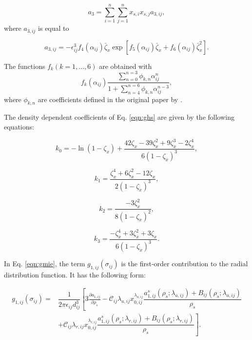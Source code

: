 \begin{equation}
a_{3} = \sum_{i=1}^{n} \sum_{j=1}^{n} x_{s,i} x_{s,j} a_{3,ij},
\end{equation}	
where $a_{3,ij}$ is equal to

\begin{equation}
a_{3,ij} = - \epsilon _{ij}^{3} f_{4}(\alpha_{ij}) \bar{\zeta}_{x} \exp[f_{5}(\alpha_{ij}) \bar{\zeta}_{x}+ f_{6}(\alpha_{ij}) \bar{\zeta}_{x}^{2}].
\end{equation}

The functions $f_{k}(k=1,...,6)$ are obtained with
\begin{equation}
f_{k}(\alpha_{ij}) \dfrac{\sum_{n=0}^{n=3} \phi_{k,n} \alpha_{ij}^{n}}{1+ \sum_{n=4}^{n=6} \phi_{k,n} \alpha_{ij}^{n-3}},
\end{equation}
where $\phi_{k,n}$ are coefficients defined in the original paper by .

The density dependent coefficients of Eq. \ref{eqn:ghs} are given by the following equations:

\begin{equation}
k_{0} = - \ln(1-{\zeta}_{x}) + \frac{42{\zeta}_{x} -39{\zeta}_{x}^{2}+ 9{\zeta}_{x}^{3}-2{\zeta}_{x}^{4}}{6(1-\zeta_{x})^{3}},
\end{equation}

\begin{equation}
k_{1} = \frac{{\zeta}_{x}^{4} +6{\zeta}_{x}^{2}- 12{\zeta}_{x}}{2(1-\zeta_{x})^{3}},
\end{equation}

\begin{equation}
k_{2} = \frac{-3{\zeta}_{x}^{2}}{8(1-\zeta_{x})^{2}},
\end{equation}

\begin{equation}
k_{3} = \frac{-{\zeta}_{x}^{4}+3{\zeta}_{x}^{2}+3{\zeta}_{x}}{6(1-\zeta_{x})^{3}}.
\end{equation}

In Eq. \ref{eqn:gmie}, the term $g_{1,ij}(\sigma_{ij})$ is the first-order contribution to the radial distribution function. It has the following form:

\begin{equation}
\begin{aligned}
g_{1,ij}(\sigma_{ij}) {}=& \dfrac{1}{2 \pi \epsilon_{ij} d _{ij}^{3}} \left[ 3 \frac{\partial a_{1,ij}}{\partial \rho _{s}}   - \mathcal{C}_{ij} \lambda_{a,ij} x_{0,ij}^{\lambda_{a,ij}} \dfrac{a_{1,ij}^{s}(\rho_{s};\lambda_{a,ij})+B_{ij}(\rho_{s};\lambda_{a,ij})}{\rho _{s}} \right. \\
& \left.  + \mathcal{C}_{ij} \lambda_{r,ij} x_{0,ij}^{\lambda_{r,ij}} \dfrac{a_{1,ij}^{s}(\rho_{s};\lambda_{r,ij})+B_{ij}(\rho_{s};\lambda_{r,ij})}{\rho _{s}} \right].
\end{aligned}
\label{eq:g1saft}
\end{equation} 


